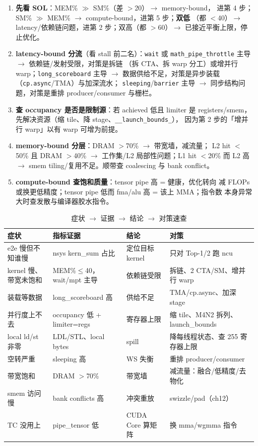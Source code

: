 \begin{enumerate}
\item \textbf{先看 SOL}：MEM\% $\gg$ SM\%（差 $>$20）$\to$ memory-bound，
  进第 4 步；SM\% $\gg$ MEM\% $\to$ compute-bound，进第 5 步；\textbf{双低}
  （都 $<$40）$\to$ latency/依赖链问题，进第 2 步；双高（都 $>$60）$\to$
  已接近平衡上限，停止优化。
\item \textbf{latency-bound 分流}（看 stall 前二名）：\texttt{wait} 或
  \texttt{math\_\allowbreak{}pipe\_\allowbreak{}throttle} 主导 $\to$ 依赖链/发射受限，对策是拆链
  （拆 CTA、拆 warp 分工）或增并行 warp；\texttt{long\_\allowbreak{}scoreboard} 主导
  $\to$ 数据供给不足，对策是异步装载（\texttt{cp.async}/TMA）与加深流水；
  \texttt{sleeping}/\texttt{barrier} 主导 $\to$ 同步结构问题，对策是重排
  producer/consumer 与栅栏。
\item \textbf{查 occupancy 是否是限制源}：若 achieved 低且 limiter 是
  registers/smem，先解决资源（缩 tile、降 stage、\texttt{\_\allowbreak{}\_\allowbreak{}launch\_\allowbreak{}bounds\_\allowbreak{}}），
  因为第 2 步的「增并行 warp」以有 warp 可增为前提。
\item \textbf{memory-bound 分层}：DRAM $>$70\% $\to$ 带宽墙，减流量；
  L2 hit $<$50\% 且 DRAM $>$40\% $\to$ 工作集/L2 局部性问题；L1 hit $<$20\%
  而 L2 高 $\to$ smem tiling/复用不足。顺带查 coalescing 与 bank conflict。
\item \textbf{compute-bound 查饱和质量}：tensor pipe 高 = 健康，优化转向
  减 FLOPs 或换更低精度；tensor pipe 低而 fma/alu 高 = 该上 MMA；指令数
  本身异常大时查发散与编译器胶水指令。
\end{enumerate}

\begin{table}[htbp]
\centering
\caption{症状 $\to$ 证据 $\to$ 结论 $\to$ 对策速查}
\label{tab:00-tree}
\begin{tabular}{p{3.4cm}p{4.2cm}p{2.6cm}p{4.4cm}}
\toprule
症状 & 指标证据 & 结论 & 对策 \\
\midrule
e2e 慢但不知谁慢 & nsys kern\_sum 占比 & 定位目标 kernel & 只对 Top-1/2 跑 ncu \\
kernel 慢、带宽未饱和 & MEM\%$\le$40，wait/mpt 主导 & 依赖链受限 & 拆链、2 CTA/SM、增并行 warp \\
装载等数据 & long\_scoreboard 高 & 供给不足 & TMA/cp.async、加深 stage \\
并行度上不去 & occupancy 低 + limiter=regs & 寄存器上限 & 缩 tile、M4N2 拆列、launch\_bounds \\
local ld/st 非零 & LDL/STL、local bytes & spill & 降每线程状态、查 255 寄存器上限 \\
空转严重 & sleeping 高 & WS 失衡 & 重排 producer/consumer \\
带宽饱和 & DRAM $>$70\% & 带宽墙 & 减流量：融合/低精度/去物化 \\
smem 访问慢 & bank conflicts 高 & 冲突重放 & swizzle/pad（ch12） \\
TC 没用上 & pipe\_tensor 低 & CUDA Core 算矩阵 & 换 mma/wgmma 指令 \\
\bottomrule
\end{tabular}
\end{table}


